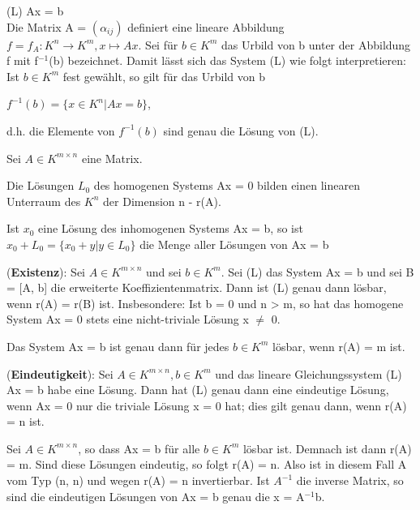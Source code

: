 (L)  Ax = b\\
Die Matrix A = $(\alpha_{ij})$ definiert eine lineare Abbildung $f = f_A: K^n \to K^m, x \mapsto Ax$. Sei für $b \in K^m$ das Urbild von b unter der Abbildung f mit f$^{-1}$(b) bezeichnet. Damit lässt sich das System (L) wie folgt interpretieren: Ist $b \in K^m$ fest gewählt, so gilt für das Urbild von b
\begin{center}
$f^{-1}(b) = \{x \in K^n | Ax = b\}$,
\end{center}
d.h. die Elemente von $f^{-1}(b)$ sind genau die Lösung von (L).

\begin{lemma}
Sei $A \in K^{m \times n}$ eine Matrix.
\begin{compactenum}
\item Die Lösungen $L_0$ des homogenen Systems Ax = 0 bilden einen linearen Unterraum des $K^n$ der Dimension n - r(A).
\item Ist $x_0$ eine Lösung des inhomogenen Systems Ax = b, so ist $x_0 + L_0 = \{x_0 +y | y \in L_0\}$ die Menge aller Lösungen von Ax = b
\end{compactenum}
\end{lemma}

\begin{proposition}
(\textbf{Existenz}): Sei $A \in K^{m \times n}$ und sei $b \in K^m$. Sei (L) das System Ax = b und sei B = [A, b] die erweiterte Koeffizientenmatrix. Dann ist (L) genau dann lösbar, wenn r(A) = r(B) ist. Insbesondere: Ist b = 0 und n > m, so hat das homogene System Ax = 0 stets eine nicht-triviale Lösung x $\neq$ 0.
\end{proposition}

\begin{remark}
Das System Ax = b ist genau dann für jedes $b \in K^m$ lösbar, wenn r(A) = m ist.
\end{remark}

\begin{proposition}
(\textbf{Eindeutigkeit}): Sei $A \in K^{m \times n},b \in K^m$ und das lineare Gleichungssystem (L) Ax = b habe eine Lösung. Dann hat (L) genau dann eine eindeutige Lösung, wenn Ax = 0 nur die triviale Lösung x = 0 hat; dies gilt genau dann, wenn r(A) = n ist.
\end{proposition}

\begin{remark}
Sei $A \in K^{m \times n}$, so dass Ax = b für alle $b \in K^m$ lösbar ist. Demnach ist dann r(A) = m. Sind diese Lösungen eindeutig, so folgt r(A) = n. Also ist in diesem Fall A vom Typ (n, n) und wegen r(A) = n invertierbar. Ist $A^{-1}$ die inverse Matrix, so sind die eindeutigen Lösungen von Ax = b genau die x = A$^{-1}$b.
\end{remark}

